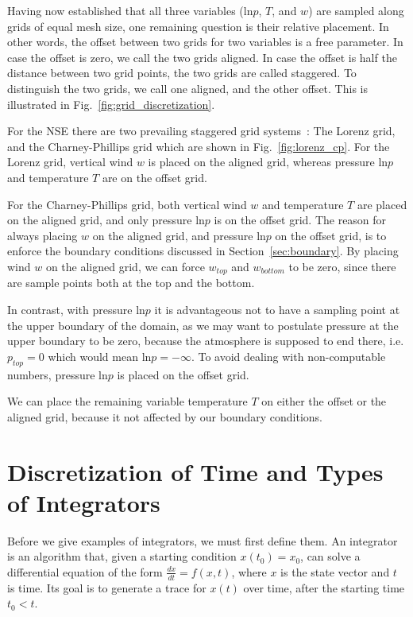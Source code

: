 Having now established that all three variables ($\text{ln}p$, $T$, and $w$) are sampled along grids of equal mesh size, one remaining question is their relative placement.
In other words, the offset between two grids for two variables is a free parameter.
In case the offset is zero, we call the two grids aligned.
In case the offset is half the distance between two grid points, the two grids are called staggered.
To distinguish the two grids, we call one aligned, and the other offset.
This is illustrated in Fig.~\ref{fig:grid_discretization}.

For the NSE there are two prevailing staggered grid systems~\cite{holdaway2013comparison}: The Lorenz grid, and the Charney-Phillips grid which are shown in Fig.~\ref{fig:lorenz_cp}.
For the Lorenz grid, vertical wind $w$ is placed on the aligned grid, whereas pressure $\text{ln}p$ and temperature $T$ are on the offset grid.

For the Charney-Phillips grid, both vertical wind $w$ and temperature $T$ are placed on the aligned grid, and only pressure $\text{ln}p$ is on the offset grid.
The reason for always placing $w$ on the aligned grid, and pressure $\text{ln}p$ on the offset grid, is to enforce the boundary conditions discussed in Section~\ref{sec:boundary}.
By placing wind $w$ on the aligned grid, we can force $w_{top}$ and $w_{bottom}$ to be zero, since there are sample points both at the top and the bottom.

In contrast, with pressure $\text{ln}p$ it is advantageous not to have a sampling point at the upper boundary of the domain, as we may want to postulate pressure at the upper boundary to be zero, because the atmosphere is supposed to end there, i.e. $p_{top}=0$ which would mean $\text{ln}p = -\infty$.
To avoid dealing with non-computable numbers, pressure $\text{ln}p$ is placed on the offset grid.

We can place the remaining variable temperature $T$ on either the offset or the aligned grid, because it not affected by our boundary conditions.

\section{Discretization of Time and Types of Integrators}\label{sec:integrators}
Before we give examples of integrators, we must first define them.
An integrator is an algorithm that, given a starting condition $x(t_0) = x_0$, can solve a differential equation of the form $\frac{dx}{dt} = f(x,t)$, where $x$ is the state vector and $t$ is time.
Its goal is to generate a trace for $x(t)$ over time, after the starting time $t_0<t$.

